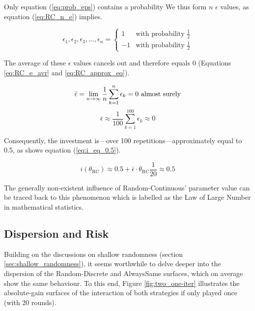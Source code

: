 \documentclass[11pt]{article}
\begin{document}
	\noindent
	Only equation (\ref{eq:prob_eps}) contains a probability
	We thus form $n$ $\epsilon$ values, as equation (\ref{eq:RC_n_e}) implies.

	\begin{equation}
		\epsilon_1, \epsilon_2, \epsilon_3, \dots, \epsilon_n = 
		\begin{cases}
		  1 & \text{with probability } \frac{1}{2}\\
		 -1 & \text{with probability } \frac{1}{2} 
		\end{cases}
		\label{eq:RC_n_e}
	\end{equation}

	\noindent	
	The average of these $\epsilon$ values cancels out and therefore equals 0 (Equations \ref{eq:RC_e_avr} and \ref{eq:RC_approx_eq}).

	\begin{equation}
		\bar \epsilon = \lim_{n\to\infty} \frac{1}{n} \sum_{k=1}^{n} \epsilon_k = 0 \text{ almost surely}\\
		\label{eq:RC_e_avr}
	\end{equation}
	\begin{equation}
		\bar \epsilon \approx \frac{1}{100} \sum_{k=1}^{100} \epsilon_k \approx 0
		\label{eq:RC_approx_eq}
	\end{equation}

	\noindent
	Consequently, the investment is---over 100 repetitions---approximately equal to 0.5, as shows equation (\ref{eq:i_eq_0.5}).

	\begin{equation}
		i(\theta_{\mathrm{RC}}) \approx 0.5 + \bar \epsilon \cdot \theta_{\mathrm{RC}} \frac{1}{20} \approx 0.5
		\label{eq:i_eq_0.5}
	\end{equation}

	\noindent
	The generally non-existent influence of Random-Continuous' parameter value can be traced back to this phenomenon which is labelled as the Law of Large Number in mathematical statistics.


\subsection{Dispersion and Risk} \label{sec:RndD_vs_AlwS}
	
	Building on the discussions on shallow randomness (section \ref{sec:shallow_randomness}), it seems worthwhile to delve deeper into the dispersion of the Random-Discrete and AlwaysSame surfaces, which on average show the same behaviour.
	To this end, Figure \ref{fig:two_one-iter} illustrates the absolute-gain surfaces of the interaction of both strategies if only played once (with 20 rounds).
\end{document}
